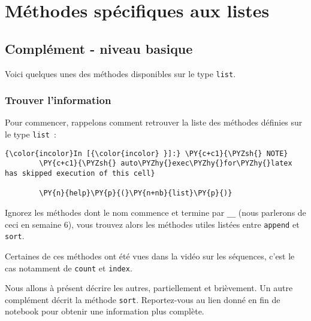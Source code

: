     
    
    
    

    

    \hypertarget{muxe9thodes-spuxe9cifiques-aux-listes}{%
\section{Méthodes spécifiques aux
listes}\label{muxe9thodes-spuxe9cifiques-aux-listes}}

    \hypertarget{compluxe9ment---niveau-basique}{%
\subsection{Complément - niveau
basique}\label{compluxe9ment---niveau-basique}}

    Voici quelques unes des méthodes disponibles sur le type \texttt{list}.

    \hypertarget{trouver-linformation}{%
\subsubsection{Trouver l'information}\label{trouver-linformation}}

    Pour commencer, rappelons comment retrouver la liste des méthodes
définies sur le type \texttt{list}~:

    \begin{Verbatim}[commandchars=\\\{\},frame=single,framerule=0.3mm,rulecolor=\color{cellframecolor}]
{\color{incolor}In [{\color{incolor} }]:} \PY{c+c1}{\PYZsh{} NOTE}
        \PY{c+c1}{\PYZsh{} auto\PYZhy{}exec\PYZhy{}for\PYZhy{}latex has skipped execution of this cell}
        
        \PY{n}{help}\PY{p}{(}\PY{n+nb}{list}\PY{p}{)}
\end{Verbatim}


    Ignorez les méthodes dont le nom commence et termine par \texttt{\_\_}
(nous parlerons de ceci en semaine 6), vous trouvez alors les méthodes
utiles listées entre \texttt{append} et \texttt{sort}.

Certaines de ces méthodes ont été vues dans la vidéo sur les séquences,
c'est le cas notamment de \texttt{count} et \texttt{index}.

    Nous allons à présent décrire les autres, partiellement et brièvement.
Un autre complément décrit la méthode \texttt{sort}. Reportez-vous au
lien donné en fin de notebook pour obtenir une information plus
complète.

